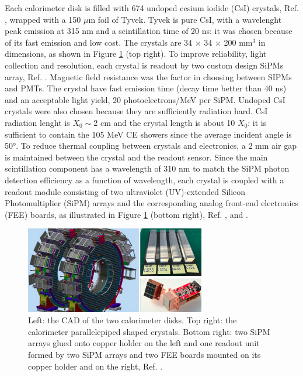 Each calorimeter disk is filled with 674 undoped cesium iodide (CsI) crystals, Ref. \cite{em6}, wrapped with a 150 $\mu$m foil of Tyvek. 
Tyvek is pure CsI, with a wavelenght peak emission at 315 nm and a scintillation time of 20 ns: it was chosen because of its
fast emission and low cost. The crystals are 34 $\times$ 34 $\times$ 200 mm$^3$ in dimensions, as shown in Figure \ref{fig:calo2} (top right). 
To improve reliability, light collection and resolution, each crystal is readout by two custom design SiPMs array, Ref. \cite{em1}. 
Magnetic field resistance was the factor in choosing between SIPMs and PMTs.
The crystal have fast emission time (decay time better than 40 ns) and an acceptable light yield, 20 photoelectrons/MeV per SiPM.
Undoped CsI crystals were also chosen because they are sufficiently radiation hard.
CsI radiation lenght is $X_0 \sim $2 cm and the crystal length is about 10 $X_0$:
it is sufficient to contain the 105 MeV CE showers since the average incident angle is 50°. 
To reduce thermal coupling between crystals and electronics, a 2 mm air gap is maintained between the crystal and the readout sensor. 
Since the main scintillation component has a wavelength of 310 nm to match the SiPM
photon detection efficiency as a function of wavelength, each crystal is coupled with a readout 
module consisting of two ultraviolet (UV)-extended Silicon Photomultiplier (SiPM) arrays
and the corresponding analog front-end electronics (FEE) boards, as illustrated in Figure \ref{fig:calo2} (bottom right), 
Ref. \cite{em5}, \cite{em2} and \cite{em3}. 
\begin{figure}[!h]
    \centering
    \includegraphics[width =0.7\textwidth]{figures/png/Screenshot_20240322_121000.png}
    \caption{Left: the CAD of the two calorimeter disks. Top right: the calorimeter parallelepiped shaped crystals.
            Bottom right: two SiPM arrays glued onto copper holder on the left and one readout 
            unit formed by two SiPM arrays and two FEE boards mounted on its
            copper holder and on the right, Ref. \cite{em4}.}
    \label{fig:calo2}
\end{figure}
